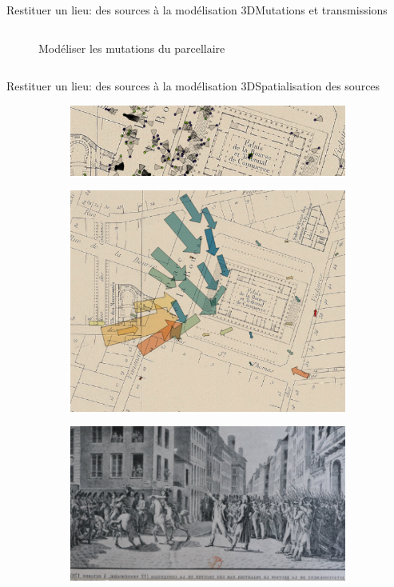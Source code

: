 \documentclass[8pt]{beamer}
\begin{document}
\begin{frame}{Restituer un lieu: des sources à la modélisation 3D}{Mutations et transmissions}
\begin{columns}[c]
\begin{column}{0.5\textwidth}
\begin{figure}
				\caption{Modéliser les mutations du parcellaire}
			\end{figure}
		\end{column}
	\end{columns}
\end{frame}

\begin{frame}{Restituer un lieu: des sources à la modélisation 3D}{Spatialisation des sources}
	\begin{figure}
		\begin{subfigure}{\textwidth}
			\includegraphics[width=\textwidth]{includes/c_slide4_0.png}
			\vspace{0.5cm}	
		\end{subfigure}
		\begin{subfigure}{0.4\textwidth}
			\includegraphics[width=\textwidth]{includes/c_slide4_1.png}
		\end{subfigure}
		\begin{subfigure}{0.45\textwidth}
			\includegraphics[width=\textwidth]{includes/c_slide4_2.png}

\end{subfigure}
\end{figure}
\end{frame}
\end{document}
